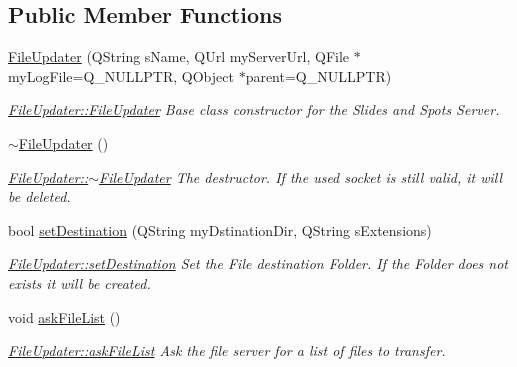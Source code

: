 \subsection*{Public Member Functions}
\begin{DoxyCompactItemize}
\item 
\mbox{\hyperlink{classFileUpdater_ae72e563d822b8daef58e2c2f515af3fc}{File\+Updater}} (Q\+String s\+Name, Q\+Url my\+Server\+Url, Q\+File $\ast$my\+Log\+File=Q\+\_\+\+N\+U\+L\+L\+P\+TR, Q\+Object $\ast$parent=Q\+\_\+\+N\+U\+L\+L\+P\+TR)
\begin{DoxyCompactList}\small\item\em \mbox{\hyperlink{classFileUpdater_ae72e563d822b8daef58e2c2f515af3fc}{File\+Updater\+::\+File\+Updater}} Base class constructor for the Slides and Spots Server. \end{DoxyCompactList}\item 
\mbox{\label{classFileUpdater_a5759d843d1dcb702f1adbb97e61bb440}} 
\mbox{\hyperlink{classFileUpdater_a5759d843d1dcb702f1adbb97e61bb440}{$\sim$\+File\+Updater}} ()
\begin{DoxyCompactList}\small\item\em \mbox{\hyperlink{classFileUpdater_a5759d843d1dcb702f1adbb97e61bb440}{File\+Updater\+::$\sim$\+File\+Updater}} The destructor. If the used socket is still valid, it will be deleted. \end{DoxyCompactList}\item 
bool \mbox{\hyperlink{classFileUpdater_aad3c90fbc960c8aa84b964f3ae1d8f11}{set\+Destination}} (Q\+String my\+Dstination\+Dir, Q\+String s\+Extensions)
\begin{DoxyCompactList}\small\item\em \mbox{\hyperlink{classFileUpdater_aad3c90fbc960c8aa84b964f3ae1d8f11}{File\+Updater\+::set\+Destination}} Set the File destination Folder. If the Folder does not exists it will be created. \end{DoxyCompactList}\item 
\mbox{\label{classFileUpdater_a7935a0431987ac2bcdd0b602afc69203}} 
void \mbox{\hyperlink{classFileUpdater_a7935a0431987ac2bcdd0b602afc69203}{ask\+File\+List}} ()
\begin{DoxyCompactList}\small\item\em \mbox{\hyperlink{classFileUpdater_a7935a0431987ac2bcdd0b602afc69203}{File\+Updater\+::ask\+File\+List}} Ask the file server for a list of files to transfer. \end{DoxyCompactList}\end{DoxyCompactItemize}


